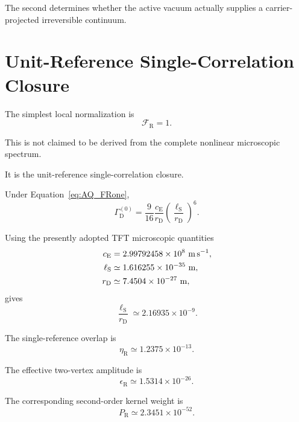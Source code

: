 The second determines whether the active vacuum actually supplies a
carrier-projected irreversible continuum.


\section{Unit-Reference Single-Correlation Closure}

The simplest local normalization is
\begin{equation}
    \boxed{
    \mathcal F_{\mathrm R}=1.
    }
    \label{eq:AQ_FRone}
\end{equation}

This is not claimed to be derived from the complete nonlinear microscopic
spectrum.

It is the unit-reference single-correlation closure.

Under Equation~\eqref{eq:AQ_FRone},
\begin{equation}
    \boxed{
    \Gamma_{\mathrm D}^{(0)}
    =
    \frac{9}{16}
    \frac{c_{\mathrm E}}{r_{\mathrm D}}
    \left(
        \frac{\ell_{\mathrm S}}{r_{\mathrm D}}
    \right)^6.
    }
    \label{eq:AQ_gamma0}
\end{equation}

Using the presently adopted TFT microscopic quantities
\begin{align}
    c_{\mathrm E}
    &=
    2.99792458\times10^8
    \ {\rm m\,s^{-1}},
    \\
    \ell_{\mathrm S}
    &\simeq
    1.616255\times10^{-35}
    \ {\rm m},
    \\
    r_{\mathrm D}
    &\simeq
    7.4504\times10^{-27}
    \ {\rm m},
\end{align}
gives
\begin{equation}
    \frac{\ell_{\mathrm S}}{r_{\mathrm D}}
    \simeq
    2.16935\times10^{-9}.
\end{equation}

The single-reference overlap is
\begin{equation}
    \eta_{\mathrm R}
    \simeq
    1.2375\times10^{-13}.
\end{equation}

The effective two-vertex amplitude is
\begin{equation}
    \epsilon_{\mathrm R}
    \simeq
    1.5314\times10^{-26}.
\end{equation}

The corresponding second-order kernel weight is
\begin{equation}
    \boxed{
    P_{\mathrm R}
    \simeq
    2.3451\times10^{-52}.
    }
    \label{eq:AQ_PR_numeric}
\end{equation}

